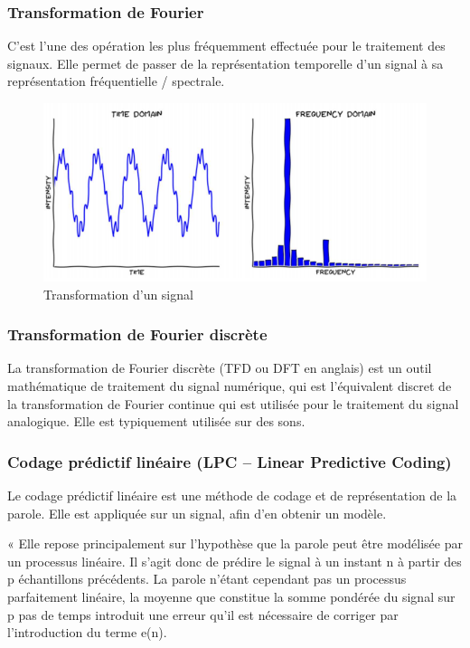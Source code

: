 \documentclass[a4paper, 12pt]{book}
\begin{document}
\subsubsection{Transformation de Fourier}

C’est l’une des opération les plus fréquemment effectuée pour le traitement des signaux. Elle permet de passer de la représentation temporelle d’un signal à sa représentation fréquentielle / spectrale.

\begin{figure}[htbp]
  \centering
  \includegraphics[width=1\linewidth]{fig/fourier.png}
  \caption{Transformation d’un signal}
\end{figure}

\subsubsection{Transformation de Fourier discrète}

La transformation de Fourier discrète (TFD ou DFT en anglais) est un outil mathématique de traitement du signal numérique, qui est l'équivalent discret de la transformation de Fourier continue qui est utilisée pour le traitement du signal analogique. Elle est typiquement utilisée sur des sons.

\subsubsection{Codage prédictif linéaire (LPC – Linear Predictive Coding)}

Le codage prédictif linéaire est une méthode de codage et de représentation de la parole. Elle est appliquée sur un signal, afin d’en obtenir un modèle.

« Elle repose principalement sur l’hypothèse que la parole peut être modélisée par un processus linéaire. Il s’agit donc de prédire le signal à un instant n à partir des p échantillons précédents. La parole n’étant cependant pas un processus parfaitement linéaire, la moyenne que constitue la somme pondérée du signal sur p pas de temps introduit une erreur qu’il est nécessaire de corriger par l’introduction du terme e(n).
\end{document}
